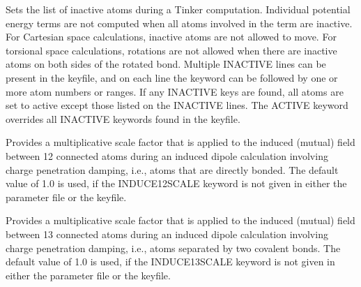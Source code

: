\documentclass[letterpaper,11pt,english]{sphinxmanual}
\begin{document}
\ignorespaces {}\label{\detokenize{text/keywords:key-inactive}}\begin{description}
\sphinxAtStartPar
Sets the list of inactive atoms during a Tinker computation. Individual potential energy terms are not computed when all atoms involved in the term are inactive. For Cartesian space calculations, inactive atoms are not allowed to move. For torsional space calculations, rotations are not allowed when there are inactive atoms on both sides of the rotated bond. Multiple INACTIVE lines can be present in the keyfile, and on each line the keyword can be followed by one or more atom numbers or ranges. If any INACTIVE keys are found, all atoms are set to active except those listed on the INACTIVE lines. The ACTIVE keyword overrides all INACTIVE keywords found in the keyfile.

\end{description}

\ignorespaces {}\label{\detokenize{text/keywords:key-induce-12-scale}}\begin{description}
\sphinxAtStartPar
Provides a multiplicative scale factor that is applied to the induced (mutual) field between 1\sphinxhyphen{}2 connected atoms during an induced dipole calculation involving charge penetration damping, i.e., atoms that are directly bonded. The default value of 1.0 is used, if the INDUCE\sphinxhyphen{}12\sphinxhyphen{}SCALE keyword is not given in either the parameter file or the keyfile.

\end{description}

\ignorespaces {}\label{\detokenize{text/keywords:key-induce-13-scale}}\begin{description}
\sphinxAtStartPar
Provides a multiplicative scale factor that is applied to the induced (mutual) field between 1\sphinxhyphen{}3 connected atoms during an induced dipole calculation involving charge penetration damping, i.e., atoms separated by two covalent bonds. The default value of 1.0 is used, if the INDUCE\sphinxhyphen{}13\sphinxhyphen{}SCALE keyword is not given in either the parameter file or the keyfile.

\end{description}
\end{document}
